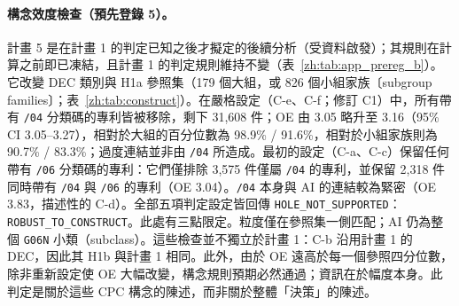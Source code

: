 \paragraph{構念效度檢查（預先登錄 5）。} 計畫 5 是在計畫 1 的判定已知之後才擬定的後續分析（受資料啟發）；其規則在計算之前即已凍結，且計畫 1 的判定規則維持不變（表~\ref{zh:tab:app_prereg_b}）。它改變 DEC 類別與 H1a 參照集（179 個大組，或 826 個小組家族〔subgroup families〕；表~\ref{zh:tab:construct}）。在嚴格設定（C-e、C-f；修訂 C1）中，所有帶有 \texttt{/04} 分類碼的專利皆被移除，剩下 31,608 件；OE 由 3.05 略升至 3.16（95\% CI 3.05--3.27），相對於大組的百分位數為 98.9\% / 91.6\%，相對於小組家族則為 90.7\% / 83.3\%；過度連結並非由 \texttt{/04} 所造成。最初的設定（C-a、C-c）保留任何帶有 \texttt{/06} 分類碼的專利：它們僅排除 3,575 件僅屬 \texttt{/04} 的專利，並保留 2,318 件同時帶有 \texttt{/04} 與 \texttt{/06} 的專利（OE 3.04）。\texttt{/04} 本身與 AI 的連結較為緊密（OE 3.83，描述性的 C-d）。全部五項判定設定皆回傳 \texttt{HOLE\_\allowbreak NOT\_\allowbreak SUPPORTED}：\texttt{ROBUST\_\allowbreak TO\_\allowbreak CONSTRUCT}。此處有三點限定。粒度僅在參照集一側匹配；AI 仍為整個 \texttt{G06N} 小類（subclass）。這些檢查並不獨立於計畫 1：C-b 沿用計畫 1 的 DEC，因此其 H1b 與計畫 1 相同。此外，由於 OE 遠高於每一個參照四分位數，除非重新設定使 OE 大幅改變，構念規則預期必然通過；資訊在於幅度本身。此判定是關於這些 CPC 構念的陳述，而非關於整體「決策」的陳述。

